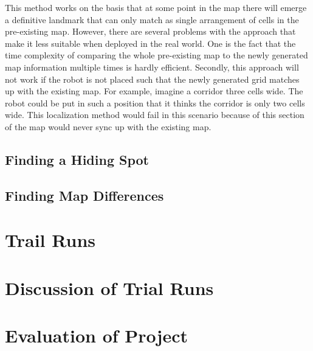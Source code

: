 \documentclass{article}
\begin{document}
This method works on the basis that at some point in the map there will emerge a definitive landmark that can only match as single arrangement of cells in the pre-existing map. However, there are several problems with the approach that make it less suitable when deployed in the real world. One is the fact that the time complexity of comparing the whole pre-existing map to the newly generated map information multiple times is hardly efficient. Secondly, this approach will not work if the robot is not placed such that the newly generated grid matches up with the existing map. For example, imagine a corridor three cells wide. The robot could be put in such a position that it thinks the corridor is only two cells wide. This localization method would fail in this scenario because of this section of the map would never sync up with the existing map.

\subsection{Finding a Hiding Spot}

\subsection{Finding Map Differences} 

\section{Trail Runs}

\section{Discussion of Trial Runs}

\section{Evaluation of Project}
\end{document}
